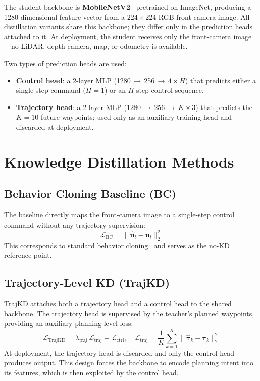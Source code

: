\documentclass[12pt,a4paper]{article}
\begin{document}
The student backbone is \textbf{MobileNetV2}~\cite{Sandler2018} pretrained on
ImageNet, producing a 1280-dimensional feature vector from a $224{\times}224$
RGB front-camera image.
All distillation variants share this backbone; they differ only in the prediction
heads attached to it.
At deployment, the student receives only the front-camera image---no LiDAR,
depth camera, map, or odometry is available.

Two types of prediction heads are used:
\begin{itemize}[noitemsep,topsep=2pt]
  \item \textbf{Control head}: a 2-layer MLP (1280\,$\to$\,256\,$\to$\,$4{\times}H$)
        that predicts either a single-step command ($H{=}1$) or an $H$-step control
        sequence.
  \item \textbf{Trajectory head}: a 2-layer MLP (1280\,$\to$\,256\,$\to$\,$K{\times}3$)
        that predicts the $K{=}10$ future waypoints; used only as an auxiliary
        training head and discarded at deployment.
\end{itemize}

\section{Knowledge Distillation Methods}

\subsection{Behavior Cloning Baseline (BC)}
The baseline directly maps the front-camera image to a single-step control command
without any trajectory supervision:
\begin{equation}
  \mathcal{L}_{\text{BC}} = \|\hat{\mathbf{u}}_t - \mathbf{u}_t\|^2_2
\end{equation}
This corresponds to standard behavior cloning~\cite{Pomerleau1989} and serves as
the no-KD reference point.

\subsection{Trajectory-Level KD (TrajKD)}
TrajKD attaches both a trajectory head and a control head to the shared backbone.
The trajectory head is supervised by the teacher's planned waypoints, providing an
auxiliary planning-level loss:
\begin{equation}
  \mathcal{L}_{\text{TrajKD}} = \lambda_{\text{traj}}\,\mathcal{L}_{\text{traj}}
  + \mathcal{L}_{\text{ctrl}},
  \quad
  \mathcal{L}_{\text{traj}} = \frac{1}{K}\sum_{k=1}^{K}\|\hat{\boldsymbol{\tau}}_k - \boldsymbol{\tau}_k\|^2_2
\end{equation}
At deployment, the trajectory head is discarded and only the control head produces
output.
This design forces the backbone to encode planning intent into its features,
which is then exploited by the control head.
\end{document}
